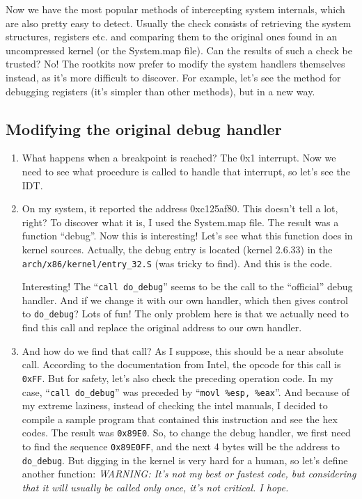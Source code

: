\documentclass[12pt]{article}
\begin{document}
  Now we have the most popular methods of intercepting system internals, which
  are also pretty easy to detect. Usually the check consists of retrieving the
  system structures, registers etc. and comparing them to the original ones
  found in an uncompressed kernel (or the System.map file). Can the results of
  such a check be trusted? No! The rootkits now prefer to modify the system
  handlers themselves instead, as it's more difficult to discover. For
  example, let's see the method for debugging registers (it's simpler than
  other methods), but in a new way.

  \subsection{Modifying the original debug handler}
  \begin{enumerate}
    \item What happens when a breakpoint is reached? The 0x1 interrupt. Now we
      need to see what procedure is called to handle that interrupt, so let's
      see the IDT.

    \item On my system, it reported the address 0xc125af80. This doesn't tell
      a lot, right? To discover what it is, I used the System.map file. The
      result was a function ``debug''. Now this is interesting! Let's see what
      this function does in kernel sources. Actually, the debug entry is
      located (kernel 2.6.33) in the \verb!arch/x86/kernel/entry_32.S! (was
      tricky to find). And this is the code.
      

   Interesting! The ``\verb!call do_debug!'' seems to be the call to the
   ``official'' debug handler. And if we change it with our own handler,
   which then gives control to \verb!do_debug!? Lots of fun! The only
   problem here is that we actually need to find this call and replace the
   original address to our own handler.

   \item And how do we find that call? As I suppose, this should be a near
     absolute call. According to the documentation from Intel, the opcode for
     this call is \verb!0xFF!. But for safety, let's also check the preceding
     operation code. In my case, ``\verb!call do_debug!'' was preceded by
     ``\verb!movl %esp, %eax!''. And because of my extreme laziness, instead
     of checking the intel manuals, I decided to compile a sample program that
     contained this instruction and see the hex codes. The result was
     \verb!0x89E0!. So, to change the debug handler, we first need to find the
     sequence \verb!0x89E0FF!, and the next 4 bytes will be the address to
     \verb!do_debug!. But digging in the kernel is very hard for a human, so
     let's define another function:  \emph{WARNING:
       It's not my best or fastest code, but considering that it will usually
       be called only once, it's not critical. I hope.}
  \end{enumerate}
  
\end{document}
